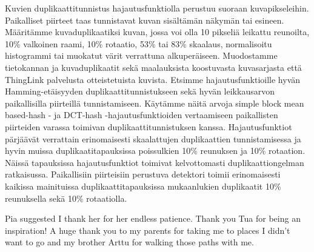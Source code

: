 \documentclass[english,12pt,a4paper,pdftex,elec,utf8, table]{aaltothesis}
\begin{document}
\newpage
%

\begin{abstractpage}[finnish]
  Kuvien duplikaattitunnistus hajautusfunktiolla perustuu suoraan kuvapikseleihin. Paikalliset piirteet taas tunnistavat kuvan sisältämän näkymän tai esineen. Määritämme kuvaduplikaatiksi kuvan, jossa voi olla 10 pikseliä leikattu reunoilta, 10\% valkoinen raami, 10\% rotaatio, 53\% tai 83\% skaalaus, normalisoitu histogrammi tai muokatut värit verrattuna alkuperäiseen. Muodostamme tietokannan ja kuvaduplikaatit sekä maalauksista koostuvasta kuvasarjasta että ThingLink palvelusta otteistetuista kuvista. Etsimme hajautusfunktioille hyvän Hamming-etäisyyden duplikaattitunnistukseen sekä hyvän leikkausarvon paikallisilla piirteillä tunnistamiseen. Käytämme näitä arvoja simple block mean based-hash - ja DCT-hash -hajautusfunktioiden vertaamiseen paikallisten piirteiden varassa toimivan duplikaattitunnistuksen kanssa. Hajautusfunktiot pärjäävät verrattain erinomaisesti skaalattujen duplikaattien tunnistamisessa ja hyvin muissa duplikaatitapauksissa poissulkien 10\% reunuksen ja 10\% rotaation. Näissä tapauksissa hajautusfunktiot toimivat kelvottomasti duplikaattiongelman ratkaisussa. Paikallisiin piirteisiin perustuva detektori toimii erinomaisesti kaikissa mainituissa duplikaattitapauksissa mukaanlukien duplikaatit 10\% reunuksella sekä 10\% rotaatiolla.
\end{abstractpage}

\newpage

Pia suggested I thank her for her endless patience. Thank you Tua for being an inspiration! A huge thank you to my parents for taking me to places I didn't want to go and my brother Arttu for walking those paths with me.
\end{document}
